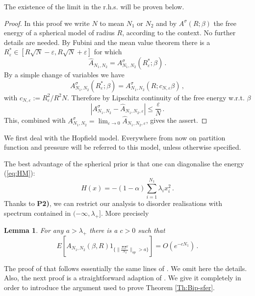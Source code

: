 \documentclass[10pt,oneside,a4paper,reqno]{amsart}  %
\newcommand{\OOO}[1]{O \left(#1\right)}
\def\be{\begin{equation}}
\def\ee{\end{equation}}
\def\a{\alpha}
\def\e{\varepsilon}
\def\b{\beta}
\def\l{\lambda}
\def\s{\sigma}
\theoremstyle{plain}
\newtheorem{lemma}[theorem]{Lemma}
\numberwithin{equation}{section}
\begin{document}
The existence of the limit in the r.h.s. will be proven below. 

\begin{proof}
In this proof we write $N$ to mean $N_1$ or $N_2$ and by $A^{\s}(R; \b)$ the free energy of a spherical model of radius $R$, according to the context. No further details are needed. By Fubini and the mean value theorem there is a $R^*_\e\in[R\sqrt N-\e,R\sqrt N+\e]$ for which
$$
\widehat A_{N_1,N_2}=A_{N_1,N_2}^{\s}(R^*_\e; \b)\,. 
$$
By a simple change of variables we have
$$
A_{N_1,N_2}^{\s}(R^*_\e; \b)=A_{N_1,N_2}^{\s}(R; c_{N,\e}\b)\,, 
$$
with $c_{N,\e}:=R^2_\e/R^2N$. Therefore by Lipschitz continuity of the free energy w.r.t. $\b$
$$
|A^\s_{N_1,N_2}-\widehat A_{N_1,N_2,\e}|\leq \frac\e N\,. 
$$
This, combined with $A^\s_{N_1,N_2}=\lim_{\e\to0} \widehat A_{N_1,N_2,\e}$, gives the assert.
\end{proof}


We first deal with the Hopfield model. Everywhere from now on partition function and pressure will be referred to this model, unless otherwise specified.

The best advantage of the spherical prior is that one can diagonalise the energy (\ref{eq:HM}):
$$
H(x)=-(1-\a)\sum_{i=1}^{N_1}\l_ix_i^2\,.
$$
Thanks to {\bf P2)}, we can restrict our analysis to disorder realisations with spectrum contained in $(-\infty,\l_+]$. More precisely 

\begin{lemma}\label{lemma:HM-sfer}
For any $a>\l_+$ there is a $c>0$ such that
\be\label{eq:lemma-HM-sfer}
E[A_{N_1,N_2}(\b,R)1_{\{\|\frac{\Xi\Xi^T}{N_2}\|_{op}>a\}}]=\OOO{e^{-cN_1}}\,. 
\ee
\end{lemma}

The proof of that follows essentially the same lines of \cite{legendre}. We omit here the details. Also, the next proof is a straightforward adaption of \cite[Proof of (9)]{legendre}. We give it completely in order to introduce the argument used to prove Theorem \ref{Th:Bip-sfer}. 
\end{document}
